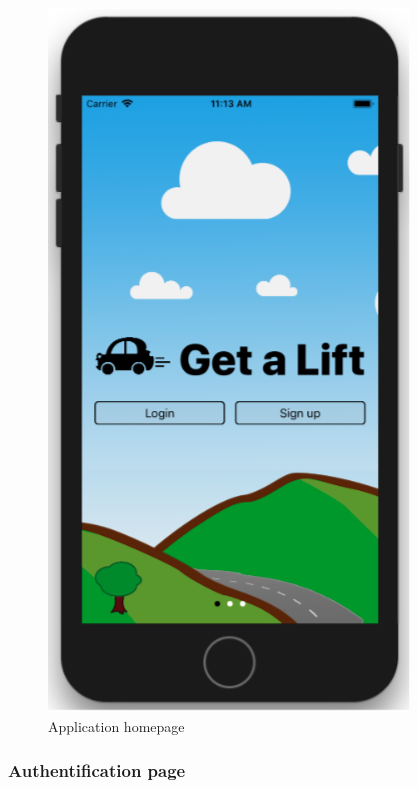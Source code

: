 \begin{figure}[h!]
\begin{center}
\includegraphics[scale = 0.25]{diagrams/ApplicationHomepage.png} 
\end{center}
\caption{Application homepage}
\end{figure}

\subsubsection{Authentification page}

